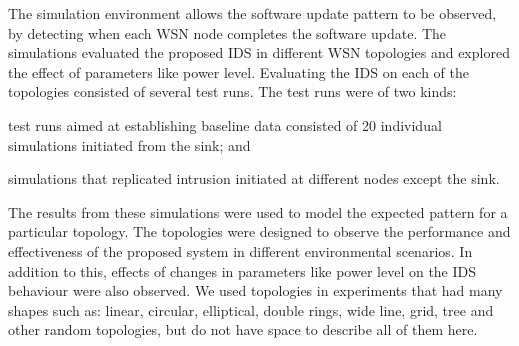 \documentclass[conference,manuscript]{IEEEtran}
\begin{document}

The simulation environment allows the software update pattern to be observed, by detecting when each WSN node completes the software update.
The simulations evaluated the proposed IDS in different WSN topologies and explored the effect of parameters like power level.
Evaluating the IDS on each of the topologies consisted of several test runs.
The test runs were of two kinds: 
\begin{inparaenum}
\item test runs aimed at establishing baseline data consisted of 20 individual simulations initiated from the sink; and
\item simulations that replicated intrusion initiated at different nodes except the sink.
\end{inparaenum}
The results from these simulations were used to model the expected pattern for a particular topology.
%
The topologies were designed to observe the performance and effectiveness %
of the proposed system in different environmental scenarios. 
In addition to this, effects of changes in parameters like power level on the IDS behaviour were also observed.
We used topologies in experiments that had many shapes such as: linear, circular, elliptical, double rings, wide line, grid, tree and other random topologies, but do not have space to describe all of them here.
\end{document}
